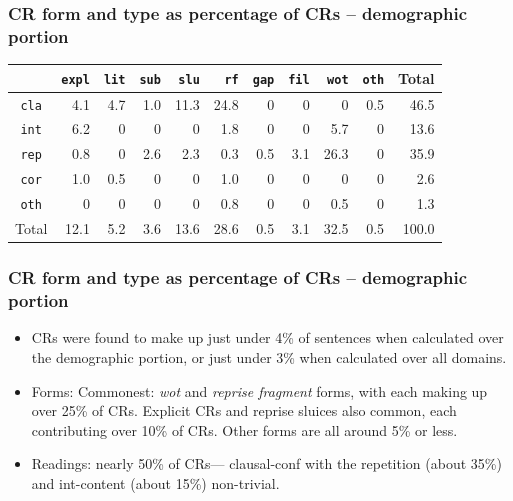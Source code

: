 \documentclass{beamer}
\newcommand{\bit}{\begin{itemize}}
\newcommand{\eit}{\end{itemize}}
\begin{document}
\begin{frame}\frametitle{CR form and type as percentage of CRs -- demographic portion}


{\tiny
\hskip -5pt\begin{tabular}{|c||r|r|r|r|r|r|r|r|r||r|}\hline
 &{\tt expl}&{\tt lit}&{\tt sub}&{\tt slu}&{\tt rf}&{\tt gap}&{\tt fil}&{\tt wot}&{\tt oth}& 
Total\\\hline\hline

{\tt cla} & 4.1  &  4.7  &  1.0  &  11.3 &  24.8 &     0 &     0 &     0 &  0.5  &  46.5 \\\hline
{\tt int} & 6.2  &     0 &    0  &     0 &  1.8  &     0 &     0 &   5.7 &     0 &  13.6 \\\hline
{\tt rep} & 0.8  &     0 &  2.6  &  2.3  &  0.3  &  0.5  &  3.1  &  26.3 &     0 &  35.9 \\\hline
{\tt cor} & 1.0  &  0.5  &    0  &     0 &  1.0  &     0 &     0 &     0 &     0 &   2.6 \\\hline
{\tt oth} &    0 &     0 &    0  &     0 &  0.8  &     0 &     0 &  0.5  &     0 &   1.3 \\\hline
\hline
 Total    & 12.1 &  5.2  &  3.6  &  13.6 &  28.6 &  0.5  &  3.1  &  32.5 &  0.5  & 100.0 \\\hline
\end{tabular}
}

\end{frame}

\begin{frame}\frametitle{CR form and type as percentage of CRs -- demographic portion}
\bit

\item CRs were found to make up just under 4\% of sentences when calculated
over the demographic portion, or just under 3\% when calculated over
all domains.

\item Forms: Commonest: {\it wot} and
{\it reprise fragment} forms, with each making up over 25\% of
CRs. Explicit CRs and reprise sluices  also common, each
contributing over 10\% of CRs. Other forms are all around 5\% or less.

\item Readings: nearly 50\% of CRs--- clausal-conf
with the repetition (about 35\%) and int-content (about
15\%) non-trivial.
\eit\end{frame}
\end{document}
